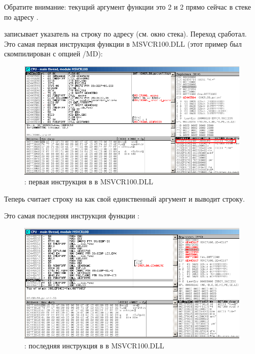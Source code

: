 Обратите внимание: текущий аргумент функции это 2 и 2 прямо сейчас в стеке по адресу .

\clearpage
\MOV записывает указатель на строку по адресу  (см. окно стека).
Переход сработал.
Это самая первая инструкция функции \printf в MSVCR100.DLL (этот пример был скомпилирован с опцией /MD): 

\begin{figure}[H]
\centering
\includegraphics[scale=\FigScale]{patterns/08_switch/1_few/olly6.png}
\caption{\olly: первая инструкция в \printf в MSVCR100.DLL}
\label{fig:switch_few_olly6}
\end{figure}

Теперь \printf считает строку на  как свой единственный аргумент и выводит строку.

\clearpage
Это самая последняя инструкция функции \printf:

\begin{figure}[H]
\centering
\includegraphics[scale=\FigScale]{patterns/08_switch/1_few/olly7.png}
\caption{\olly: последняя инструкция в \printf в MSVCR100.DLL}
\label{fig:switch_few_olly7}
\end{figure}

